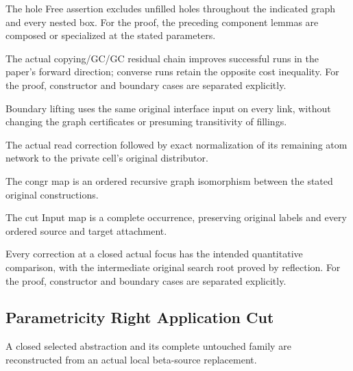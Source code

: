 The hole Free assertion excludes unfilled holes throughout the indicated graph and every nested box.
For the proof, the preceding component lemmas are composed or specialized at the stated parameters.
\par{}

The actual copying/GC/GC residual chain improves successful runs in the paper's forward direction; converse runs retain the opposite cost inequality.
For the proof, constructor and boundary cases are separated explicitly.
\par{}

Boundary lifting uses the same original interface input on every link, without changing the graph certificates or presuming transitivity of fillings.
\par{}

The actual read correction followed by exact normalization of its remaining atom network to the private cell's original distributor.
\par{}

The congr map is an ordered recursive graph isomorphism between the stated original constructions.
\par{}

The cut Input map is a complete occurrence, preserving original labels and every ordered source and target attachment.
\par{}

Every correction at a closed actual focus has the intended quantitative comparison, with the intermediate original search root proved by reflection.
For the proof, constructor and boundary cases are separated explicitly.
\par{}

\subsection{Parametricity Right Application Cut}
A closed selected abstraction and its complete untouched family are reconstructed from an actual local beta-source replacement.

